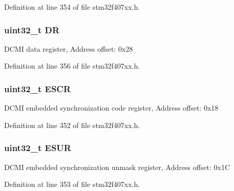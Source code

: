 Definition at line 354 of file stm32f407xx.\+h.

\subsubsection[{\texorpdfstring{DR}{DR}}]{ uint32\+\_\+t DR}\hypertarget{struct_d_c_m_i___type_def_a3df0d8dfcd1ec958659ffe21eb64fa94}{}\label{struct_d_c_m_i___type_def_a3df0d8dfcd1ec958659ffe21eb64fa94}
D\+C\+MI data register, Address offset\+: 0x28 

Definition at line 356 of file stm32f407xx.\+h.

\subsubsection[{\texorpdfstring{E\+S\+CR}{ESCR}}]{ uint32\+\_\+t E\+S\+CR}\hypertarget{struct_d_c_m_i___type_def_a9cc4ec74be864c929261e0810f2fd7f0}{}\label{struct_d_c_m_i___type_def_a9cc4ec74be864c929261e0810f2fd7f0}
D\+C\+MI embedded synchronization code register, Address offset\+: 0x18 

Definition at line 352 of file stm32f407xx.\+h.

\subsubsection[{\texorpdfstring{E\+S\+UR}{ESUR}}]{ uint32\+\_\+t E\+S\+UR}\hypertarget{struct_d_c_m_i___type_def_af751d49ef824c1636c78822ecae066f4}{}\label{struct_d_c_m_i___type_def_af751d49ef824c1636c78822ecae066f4}
D\+C\+MI embedded synchronization unmask register, Address offset\+: 0x1C 

Definition at line 353 of file stm32f407xx.\+h.

